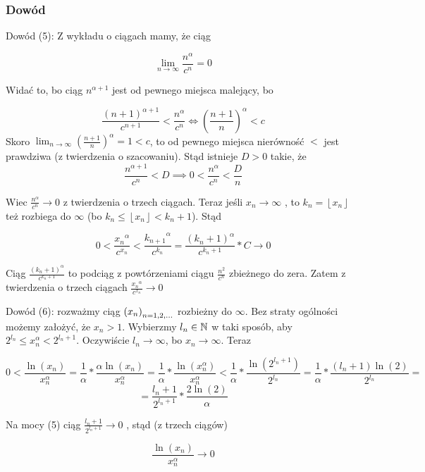 \documentclass[9pt]{article}
\begin{document}
\subsubsection*{Dowód}

Dowód (5): Z wykładu o ciągach mamy, że ciąg

\[
    \lim_{n \to \infty} \frac{n^\alpha}{c^n} = 0
\]

Widać to, bo ciąg $n^{\alpha+1}$ jest od pewnego miejsca malejący, bo

\[
    \frac{(n+1)^{\alpha+1}}{c^{n+1}} < \frac{n^\alpha}{c^n} \iff
    \left(\frac{n+1}{n}\right)^\alpha < c
\]
Skoro $\lim_{n \to \infty} \left( \frac{n+1}{n}\right)^\alpha = 1 < c$, to od pewnego miejsca
nierówność $<$ jest prawdziwa (z twierdzenia o szacowaniu). Stąd istnieje $D > 0$ takie, że
\[
    \frac{n^{\alpha+1}}{c^n} < D \implies 0 < \frac{n^\alpha}{c^n} < \frac{D}{n}
\]

Wiec $ \frac{n^\alpha}{c^n} \to 0$ z twierdzenia o trzech ciągach. Teraz jeśli $x_n \to \infty$ , to
$k_n = \left\lfloor x_n \right\rfloor$ też rozbiega do $\infty$ (bo $k_n \le \left\lfloor x_n
\right\rfloor < k_n + 1$). Stąd

\[
    0
    <
    \frac{{x_n}^\alpha}{c^{x_n}}
    <
    \frac{{k_{n+1}}^\alpha}{c^{k_n}}
    =
    \frac{(k_n+1)^\alpha}{c^{k_n+1}} * C
    \to
    0
\]

Ciąg $\frac{(k_n+1)^\alpha}{c^{k_n+1}}$ to podciąg z powtórzeniami ciągu $\frac{n^2}{c^n}$ zbieżnego
do zera. Zatem z twierdzenia o trzech ciągach $\frac{{x_n}^\alpha}{c^{x_n}} \to 0$

\bigbreak

Dowód (6): rozważmy ciąg $\left(x_n\right)_{n = 1,2,...}$ rozbieżny do $\infty$. Bez straty ogólności możemy założyć, że
$x_n > 1$. Wybierzmy $l_n \in \mathbb{N}$ w taki sposób, aby $2^{l_n} \le x_n^\alpha < 2^{l_n+1}$. Oczywiście $l_n
\to \infty$, bo $x_n \to \infty$. Teraz 

\[
    0
    <
    \frac{\ln(x_n)}{x_n^\alpha}
    =
    \frac{1}{\alpha} * \frac{\alpha \ln(x_n)}{x_n^\alpha}
    =
    \frac{1}{\alpha} * \frac{\ln(x_n^\alpha)}{x_n^\alpha}
    <
    \frac{1}{\alpha} * \frac{\ln\left(2^{l_n + 1}\right)}{2^{l_n}}
    =
    \frac{1}{\alpha} * \frac{(l_n + 1)\ln(2)}{2^{l_n}}
    =
\]
\[
    =
    \frac{l_n+1}{2^{l_n+1}} * \frac{2\ln(2)}{\alpha}
\]

Na mocy (5) ciąg 
$\frac{l_n+1}{2^{l_n+1}} \to 0$
, stąd (z trzech ciągów)

\[
    \frac{\ln(x_n)}{x_n^\alpha} \to 0
\]

\bigbreak
\end{document}

